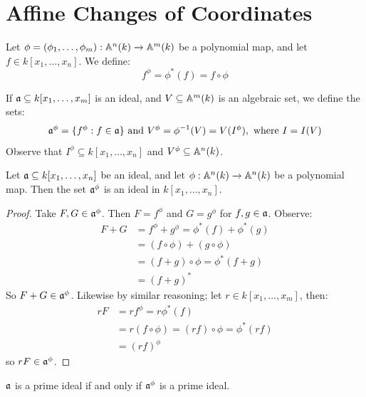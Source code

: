 \section{Affine Changes of Coordinates}

Let $\phi=(\phi_1, \dots, \phi_m):\mathbb{A}^n(k) \xrightarrow{} \mathbb{A}^m(k)$ be
a polynomial map, and let $f \in k[x_1, \dots, x_n]$. We define:
\begin{equation*}
  f^\phi=\phi^*(f)=f \circ \phi
\end{equation*}

If $\mathfrak{a} \subseteq k[x_1, \dots, x_m]$ is an ideal, and $V \subseteq
\mathbb{A}^m(k)$ is an algebraic set, we define the sets:
\begin{equation*}
  \mathfrak{a}^\phi=\{f^\phi : f \in \mathfrak{a} \} \text{ and }
  V^\phi=\phi^{-1}(V)=V(I^\phi), \text{ where } I=I(V)
\end{equation*}
Observe that $I^\phi \subseteq k[x_1, \dots, x_n]$ and $V^\phi
\subseteq \mathbb{A}^n(k)$.

\begin{proposition}\label{proposition_11.2.1}
  Let $\mathfrak{a} \subseteq k[x_1, \dots, x_n]$ be an ideal, and let
  $\phi:\mathbb{A}^n(k) \xrightarrow{} \mathbb{A}^n(k)$ be a polynomial map.
  Then the set $\mathfrak{a}^\phi$ is an ideal in $k[x_1, \dots, x_n]$.
\end{proposition}
\begin{proof}
  Take $F,G \in \mathfrak{a}^\phi$. Then $F=f^\phi$ and $G=g^\phi$ for
  $f,g \in \mathfrak{a}$. Observe:
  \begin{equation*}
    \begin{split}
      F+G &=  f^\phi+g^\phi=\phi^*(f)+\phi^*(g)  \\
          &=  (f \circ \phi)+(g \circ \phi) \\
          &=  (f+g) \circ \phi=\phi^*(f+g)  \\
          &= (f+g)^*
    \end{split}
  \end{equation*}
  So $F+G \in \mathfrak{a}^\phi$. Likewise by similar reasoning; let $r \in
  k[x_1, \dots, x_m]$, then:
  \begin{equation*}
    \begin{split}
      rF  &=  rf^\phi=r\phi^\ast(f) \\
          &=  r(f \circ \phi)=(rf) \circ \phi=\phi^\ast(rf) \\
          &= (rf)^\phi
    \end{split}
  \end{equation*}
  so $rF \in \mathfrak{a}^\phi$.
\end{proof}
\begin{corollary}
  $\mathfrak{a}$ is a prime ideal if and only if $\mathfrak{a}^\phi$ is a prime ideal.
\end{corollary}

